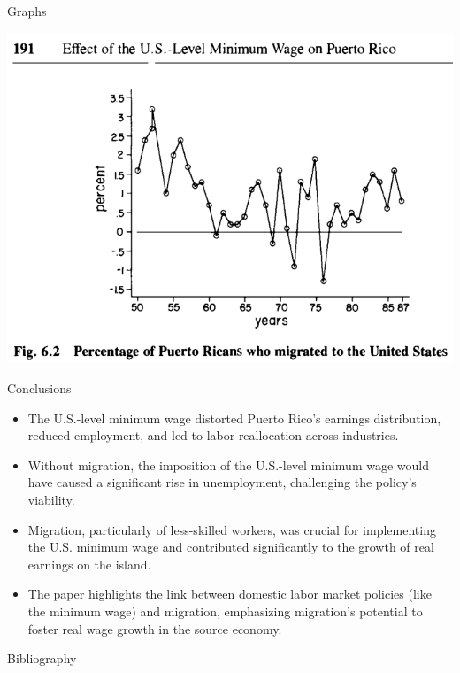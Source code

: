 \documentclass[12pt]{beamer}
\begin{document}
\begin{frame}[allowframebreaks]{Graphs}
	\begin{center}
		\includegraphics[width=1\linewidth]{assets/graph.png}
	\end{center}
\end{frame}

\begin{frame}[allowframebreaks]{Conclusions}
	\begin{itemize}
		\item The U.S.-level minimum wage distorted Puerto Rico's earnings distribution, reduced employment, and led to labor reallocation across industries.
		\item Without migration, the imposition of the U.S.-level minimum wage would have caused a significant rise in unemployment, challenging the policy's viability.
		\item Migration, particularly of less-skilled workers, was crucial for implementing the U.S. minimum wage and contributed significantly to the growth of real earnings on the island.
		\item The paper highlights the link between domestic labor market policies (like the minimum wage) and migration, emphasizing migration's potential to foster real wage growth in the source economy.
	\end{itemize}
\end{frame}
\begin{frame}[allowframebreaks]{Bibliography}
	\printbibliography
\end{frame}
\end{document}

